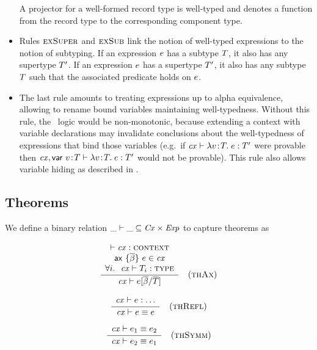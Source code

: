 \begin{itemize}
A projector for a well-formed record type is well-typed and denotes a function
from the record type to the corresponding component type.
\item
Rules $\textsc{exSuper}$ and $\textsc{exSub}$ link the notion of well-typed expressions to the
notion of subtyping. If an expression $e$ has a subtype $T$, it also
has any supertype $T'$. If an expression $e$ has a supertype $T'$,
it also has any subtype $T$ such that the associated predicate holds on
$e$.
\item
The last rule amounts to treating expressions up to alpha equivalence,
allowing to rename bound variables maintaining well-typedness. Without this
rule, the \MS\ logic would be non-monotonic, because extending a context with
variable declarations may invalidate conclusions about the well-typedness of
expressions that bind those variables (e.g.\ if $\mathit{cx}\vdash\lambda v\!:\!T.\;e:T'$ were
provable then $\mathit{cx},\mathsf{var}\ v\!:\!T\vdash\lambda v\!:\!T.\;e:T'$ would not be
provable). This rule also allows variable hiding as described in \cite{lm}.
\end{itemize}

\subsection{Theorems}

We define a binary relation $\_\vdash\_\subseteq\mathit{Cx}\times\mathit{Exp}$ to capture theorems
as

\[
\frac{\begin{array}{c}\vdash\mathit{cx}:\textsc{context}\\\mathsf{ax}\ \{\overline{\beta}\}\ e\in\mathit{cx}\\\forall i.\ \ \mathit{cx}\vdash T_i:\textsc{type}\end{array}}{\mathit{cx}\vdash e[\overline{\beta}/\overline{T}]}\quad\mbox{(\textsc{thAx})}
\]


\[
\frac{\begin{array}{c}\mathit{cx}\vdash e:\ldots\end{array}}{\mathit{cx}\vdash e\equiv e}\quad\mbox{(\textsc{thRefl})}
\]

\[
\frac{\begin{array}{c}\mathit{cx}\vdash e_1\equiv e_2\end{array}}{\mathit{cx}\vdash e_2\equiv e_1}\quad\mbox{(\textsc{thSymm})}
\]

